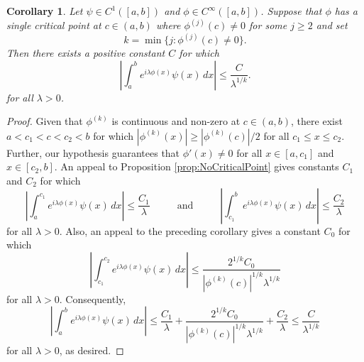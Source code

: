 \documentclass[11pt, letter]{book}
\newtheorem{corollary}[theorem]{Corollary}
\begin{document}
\begin{framed}
\begin{corollary}\label{cor:minK}
Let $\psi\in C^1([a,b])$ and $\phi\in C^{\infty}([a,b])$. Suppose that $\phi$ has a single critical point at $c\in (a,b)$ where $\phi^{(j)}(c)\neq 0$ for some $j\geq 2$ and set
\begin{equation*}
    k=\min\{j:\phi^{(j)}(c)\neq 0\}.
\end{equation*}
Then there exists a positive constant $C$ for which
\begin{equation*}
    \left|\int_a^b e^{i\lambda\phi(x)}\psi(x)\,dx\right|\leq\frac{C}{\lambda^{1/k}}.
\end{equation*}
for all $\lambda>0$.
\end{corollary}
\end{framed}
\begin{proof}
Given that $\phi^{(k)}$ is continuous and non-zero at $c\in (a,b)$, there exist $a<c_1<c<c_2<b$ for which $|\phi^{(k)}(x)|\geq |\phi^{(k)}(c)|/2$ for all $c_1\leq x\leq c_2$. Further, our hypothesis guarantees that $\phi'(x)\neq 0$ for all $x\in[a,c_1]$ and $x\in[c_2,b]$. An appeal to Proposition \ref{prop:NoCriticalPoint} gives constants $C_1$ and $C_2$ for which
\begin{equation*}
    \left|\int_a^{c_1}e^{i\lambda\phi(x)}\psi(x)\,dx\right|\leq \frac{C_1}{\lambda}\hspace{1cm}\mbox{ and }\hspace{1cm}\left|\int_{c_1}^b e^{i\lambda\phi(x)}\psi(x)\,dx\right|\leq \frac{C_2}{\lambda}
\end{equation*}
for all $\lambda>0$. Also, an appeal to the preceding corollary gives a constant $C_0$ for which
\begin{equation*}
    \left|\int_{c_1}^{c_2}e^{i\lambda\phi(x)}\psi(x)\,dx\right|\leq \frac{2^{1/k}C_0}{|\phi^{(k)}(c)|^{1/k}\lambda^{1/k}}
\end{equation*}
for all $\lambda>0$. Consequently,
\begin{equation*}
    \left|\int_a^b e^{i\lambda\phi(x)}\psi(x)\,dx\right|\leq \frac{C_1}{\lambda}+\frac{2^{1/k}C_0}{|\phi^{(k)}(c)|^{1/k}\lambda^{1/k}}+\frac{C_2}{\lambda}\leq \frac{C}{\lambda^{1/k}}
\end{equation*}
for all $\lambda>0$, as desired.
\end{proof}
\end{document}

